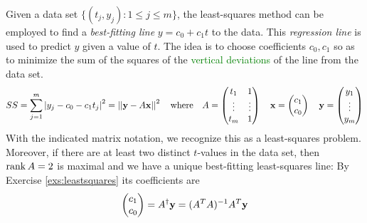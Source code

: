 


Given a data set $\big\{(t_j,y_j):1\le j\le m\big\}$, the least-squares method can be employed to find a \emph{best-fitting line} $y=c_0+c_1t$ to the data. This \emph{regression line} is used to predict $y$ given a value of $t$.\smallbreak
The idea is to choose coefficients $c_0,c_1$ so as to minimize the sum of the squares of the \textcolor{Green}{vertical deviations} of the line from the data set.
\[
	SS=\sum_{j=1}^m\left| y_j-c_0-c_1t_j\right|^2=\left| \left| {\mathbf{y}}-A{\mathbf{x}}\right|\right|^2
	\quad\text{where}\quad 
	A=\begin{pmatrix}
		t_1&1\\
		\vdots&\vdots\\
		t_m&1
	\end{pmatrix}
	\quad {\mathbf{x}}=\begin{pmatrix}c_1\\c_0\end{pmatrix}\quad 
	{\mathbf{y}}=\begin{pmatrix}y_1\\\vdots\\y_m\end{pmatrix}
\]
With the indicated matrix notation, we recognize this as a least-squares problem. Moreover, if there are at least two distinct $t$-values in the data set, then $\operatorname{rank} A=2$ is maximal and we have a unique best-fitting least-squares line: By Exercise \ref{exs:leastsquares} its coefficients are
\[
	\begin{pmatrix}c_1\\c_0\end{pmatrix}=A^\dag{\mathbf{y}} =(A^TA)^{-1}A^T{\mathbf{y}}
\]


